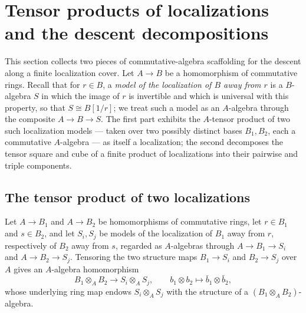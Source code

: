 \section{Tensor products of localizations and the descent decompositions}
\label{sec:tensorAway}

This section collects two pieces of commutative-algebra scaffolding for the descent along a
finite localization cover. Let \(A \to B\) be a homomorphism of commutative rings. Recall that
for \(r \in B\), a \emph{model of the localization of \(B\) away from \(r\)} is a \(B\)-algebra
\(S\) in which the image of \(r\) is invertible and which is universal with this property,
so that \(S \cong B[1/r]\); we treat such a model as an \(A\)-algebra through the composite
\(A \to B \to S\). The first part exhibits the \(A\)-tensor product of two such localization
models — taken over two possibly distinct bases \(B_1, B_2\), each a commutative
\(A\)-algebra — as itself a localization; the second decomposes the tensor square and cube of a
finite product of localizations into their pairwise and triple components.

\subsection{The tensor product of two localizations}

\begin{definition}
  \label{def:tensorAwayAlgebra}
  \leanok
  Let \(A \to B_1\) and \(A \to B_2\) be homomorphisms of commutative rings, let \(r \in B_1\)
  and \(s \in B_2\), and let \(S_i, S_j\) be models of the localization of \(B_1\) away from
  \(r\), respectively of \(B_2\) away from \(s\), regarded as \(A\)-algebras through
  \(A \to B_1 \to S_i\) and \(A \to B_2 \to S_j\). Tensoring the two structure maps
  \(B_1 \to S_i\) and \(B_2 \to S_j\) over \(A\) gives an \(A\)-algebra homomorphism
  \[
    B_1 \otimes_A B_2 \longrightarrow S_i \otimes_A S_j , \qquad
    b_1 \otimes b_2 \mapsto \bar b_1 \otimes \bar b_2 ,
  \]
  whose underlying ring map endows \(S_i \otimes_A S_j\) with the structure of a
  \((B_1 \otimes_A B_2)\)-algebra.
\end{definition}

